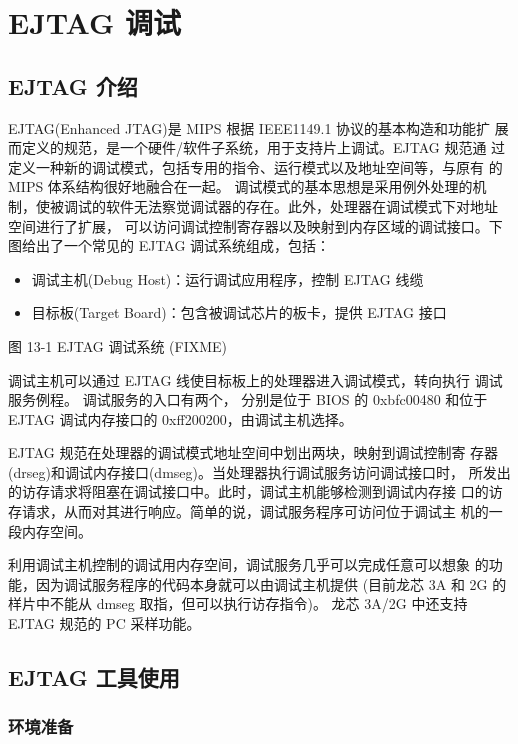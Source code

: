 \chapter{EJTAG 调试}

\section{EJTAG 介绍}

EJTAG(Enhanced JTAG)是 MIPS 根据 IEEE1149.1 协议的基本构造和功能扩
展而定义的规范，是一个硬件/软件子系统，用于支持片上调试。EJTAG 规范通
过定义一种新的调试模式，包括专用的指令、运行模式以及地址空间等，与原有 的 MIPS
体系结构很好地融合在一起。 调试模式的基本思想是采用例外处理的机
制，使被调试的软件无法察觉调试器的存在。此外，处理器在调试模式下对地址
空间进行了扩展， 可以访问调试控制寄存器以及映射到内存区域的调试接口。下
图给出了一个常见的 EJTAG 调试系统组成，包括：
\begin{itemize}
  \item 调试主机(Debug Host)：运行调试应用程序，控制 EJTAG 线缆
  \item 目标板(Target Board)：包含被调试芯片的板卡，提供 EJTAG 接口
\end{itemize}

图 13-1 EJTAG 调试系统 (FIXME)

调试主机可以通过 EJTAG 线使目标板上的处理器进入调试模式，转向执行
调试服务例程。 调试服务的入口有两个， 分别是位于 BIOS 的 0xbfc00480 和位于
EJTAG 调试内存接口的 0xff200200，由调试主机选择。

EJTAG 规范在处理器的调试模式地址空间中划出两块，映射到调试控制寄
存器(drseg)和调试内存接口(dmseg)。当处理器执行调试服务访问调试接口时，
所发出的访存请求将阻塞在调试接口中。此时，调试主机能够检测到调试内存接
口的访存请求，从而对其进行响应。简单的说，调试服务程序可访问位于调试主
机的一段内存空间。

利用调试主机控制的调试用内存空间，调试服务几乎可以完成任意可以想象
的功能，因为调试服务程序的代码本身就可以由调试主机提供 (目前龙芯 3A 和 2G
的样片中不能从 dmseg 取指，但可以执行访存指令)。 龙芯 3A/2G 中还支持 EJTAG
规范的 PC 采样功能。

\section{EJTAG 工具使用}

\subsection{环境准备}

